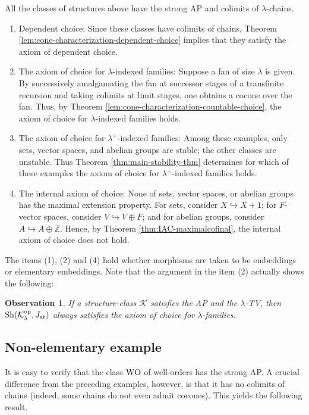 \documentclass[10pt]{amsart}
\numberwithin{equation}{section}
\theoremstyle{plain}
\newtheorem{obs}[theorem]{Observation}
\theoremstyle{definition}
\newcommand{\K}{\mathcal{K}}
\newcommand{\embed}{\hookrightarrow}
\begin{document}
All the classes of structures above have the strong AP and colimits of $\lambda$-chains.
\begin{enumerate}
\item Dependent choice: Since these classes have colimits of chains, Theorem \ref{lem:cone-characterization-dependent-choice} implies that they satisfy the axiom of dependent choice.
\item The axiom of choice for $\lambda$-indexed families:
Suppose a fan of size $\lambda$ is given.
By successively amalgamating the fan at successor stages of a transfinite recursion and taking colimits at limit stages, one obtains a cocone over the fan.
Thus, by Theorem \ref{lem:cone-characterization-countable-choice}, the axiom of choice for $\lambda$-indexed families holds.
\item The axiom of choice for $\lambda^+$-indexed families:
Among these examples, only sets, vector spaces, and abelian groups are stable; the other classes are unstable.
Thus Theorem \ref{thm:main-stability-thm} determines  for which of these examples the axiom of choice for $\lambda^+$-indexed families holds.
\item The internal axiom of choice:
None of sets, vector spaces, or abelian groups has the maximal extension property.
For sets, consider $X\embed X+1$; for $F$-vector spaces, consider $V\embed V\oplus F$; and for abelian groups, consider $A\embed A\oplus\mathbb{Z}$.
Hence, by Theorem \ref{thm:IAC-maximalcofinal}, the internal axiom of choice does not hold.
\end{enumerate}


The items (1), (2) and (4) hold whether morphisms are taken to be embeddings or elementary embeddings.
Note that the argument in the item (2) actually shows the following:
\begin{obs}
If a structure-class $\K$ satisfies the AP and the $\lambda$-TV, then ${\rm Sh}(\K_\lambda^{\rm op},J_{\rm at})$ always satisfies the axiom of choice for $\lambda$-families.
\end{obs}

\subsection{Non-elementary example}

It is easy to verify that the class ${\rm WO}$ of well-orders has the strong AP.
A crucial difference from the preceding examples, however, is that it has no colimits of chains (indeed, some chains do not even admit cocones).
This yields the following result.
\end{document}
